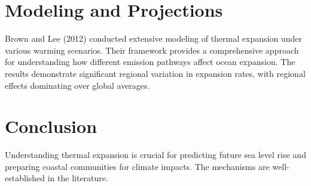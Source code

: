 \documentclass{article}
\begin{document}
\section{Modeling and Projections}

Brown and Lee (2012) \cite{BrownLee2012} conducted extensive modeling of thermal expansion under various warming
scenarios. Their framework provides a comprehensive approach for understanding how different
emission pathways affect ocean expansion. The results demonstrate significant regional variation
in expansion rates, with regional effects dominating over global averages.

\section{Conclusion}

Understanding thermal expansion is crucial for predicting future sea level rise and preparing
coastal communities for climate impacts. The mechanisms are well-established in the literature.



\end{document}
